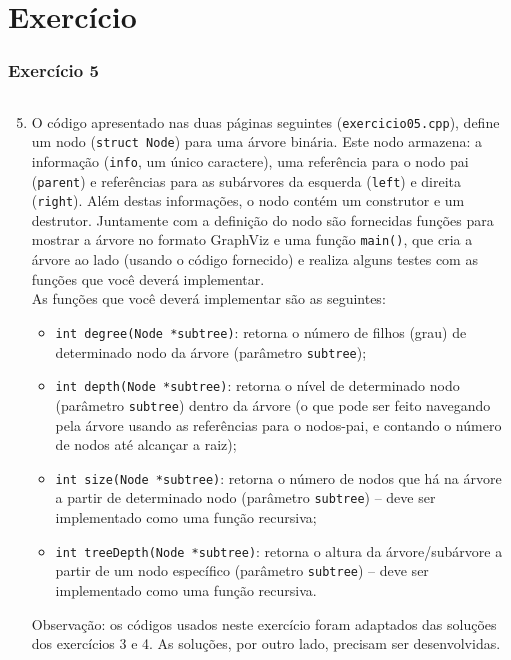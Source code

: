 \documentclass[aspectratio=169]{beamer}
\begin{document}
\section{Exercício}

\begin{frame}[fragile]\frametitle{Exercício 5}
\begin{columns}[T]
\begin{column}{0.75\linewidth}
\begin{enumerate}
        \setcounter{enumi}{4}
	\scriptsize
	\item O código apresentado nas duas páginas seguintes (\texttt{exercicio05.cpp}), define um nodo (\texttt{struct Node}) para uma árvore binária. Este nodo armazena: a informação (\texttt{info}, um único caractere), uma referência para o nodo pai (\texttt{parent}) e referências para as subárvores da esquerda (\texttt{left}) e direita (\texttt{right}). Além destas informações, o nodo contém um construtor e um destrutor. Juntamente com a definição do nodo são fornecidas funções para mostrar a árvore no formato GraphViz e uma função \texttt{main()}, que cria a árvore ao lado (usando o código fornecido) e realiza alguns testes com as funções que você deverá implementar.\\
	As funções que você deverá implementar são as seguintes:
	\begin{itemize}
		\tiny
		\item \texttt{int degree(Node *subtree)}: retorna o número de filhos (grau) de determinado nodo da árvore (parâmetro \texttt{subtree});
		\item \texttt{int depth(Node *subtree)}: retorna o nível de determinado nodo (parâmetro \texttt{subtree}) dentro da árvore (o que pode ser feito navegando pela árvore usando as referências para o nodos-pai, e contando o número de nodos até alcançar a raiz);
		\item \texttt{int size(Node *subtree)}: retorna o número de nodos que há na árvore a partir de determinado nodo (parâmetro \texttt{subtree}) -- deve ser implementado como uma função recursiva;
		\item \texttt{int treeDepth(Node *subtree)}: retorna o altura da árvore/subárvore a partir de um nodo específico (parâmetro \texttt{subtree}) -- deve ser implementado como uma função recursiva.
	\end{itemize}
Observação: os códigos usados neste exercício foram adaptados das soluções dos exercícios 3 e 4. As soluções, por outro lado, precisam ser desenvolvidas.

\end{enumerate}
\end{column}
\end{columns}
\end{frame}
\end{document}
